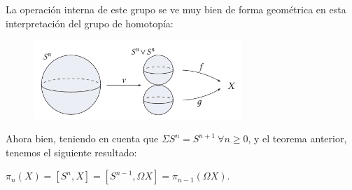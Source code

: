 La operación interna de este grupo se ve muy bien de forma geométrica en esta interpretación del grupo de homotopía: \par
\begin{figure}[h]
\centering
\includegraphics[width=0.7\textwidth]{images/ejgruphomot.pdf}
\end{figure}

Ahora bien, teniendo en cuenta que $\Sigma S^n = S^{n+1} \ \forall n \geq 0$, y el teorema anterior, tenemos el siguiente resultado:
\begin{teorf}
$\pi_n(X) = [S^n, X] = [S^{n-1}, \Omega X] = \pi_{n-1}(\Omega X)$.
\end{teorf}